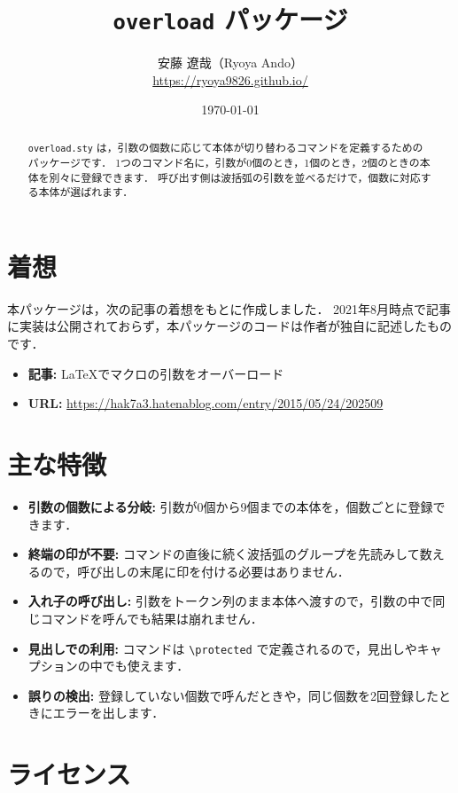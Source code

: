 \documentclass[lualatex,ja = standard,a4paper,11pt]{bxjsarticle}
\title{\texttt{overload} パッケージ}
\author{安藤 遼哉（Ryoya Ando）\\\url{https://ryoya9826.github.io/}}
\date{\today}
\begin{document}
\maketitle
\begin{abstract}
\noindent
\texttt{overload.sty} は，引数の個数に応じて本体が切り替わるコマンドを定義するためのパッケージです．
1つのコマンド名に，引数が0個のとき，1個のとき，2個のときの本体を別々に登録できます．
呼び出す側は波括弧の引数を並べるだけで，個数に対応する本体が選ばれます．
\end{abstract}

\tableofcontents

\section{着想}

本パッケージは，次の記事の着想をもとに作成しました．
2021年8月時点で記事に実装は公開されておらず，本パッケージのコードは作者が独自に記述したものです．

\begin{itemize}
\item \textbf{記事:} \LaTeX でマクロの引数をオーバーロード
\item \textbf{URL:} \url{https://hak7a3.hatenablog.com/entry/2015/05/24/202509}
\end{itemize}

\section{主な特徴}

\begin{itemize}
\item \textbf{引数の個数による分岐:}
  引数が0個から9個までの本体を，個数ごとに登録できます．
\item \textbf{終端の印が不要:}
  コマンドの直後に続く波括弧のグループを先読みして数えるので，呼び出しの末尾に印を付ける必要はありません．
\item \textbf{入れ子の呼び出し:}
  引数をトークン列のまま本体へ渡すので，引数の中で同じコマンドを呼んでも結果は崩れません．
\item \textbf{見出しでの利用:}
  コマンドは \verb|\protected| で定義されるので，見出しやキャプションの中でも使えます．
\item \textbf{誤りの検出:}
  登録していない個数で呼んだときや，同じ個数を2回登録したときにエラーを出します．
\end{itemize}

\section{ライセンス}
\end{document}
